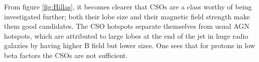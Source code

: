 From figure \ref{fig:Hillas}, it becomes clearer that CSOs are a class worthy of being investigated further; both their lobe size and their magnetic field strength make them good candidates. The CSO hotspots separate themselves from usual AGN hotspots, which are attributed to large lobes at the end of the jet in huge radio galaxies by having higher B field but lower sizes. One sees that for protons in low beta factors the CSOs are not sufficient.   %

